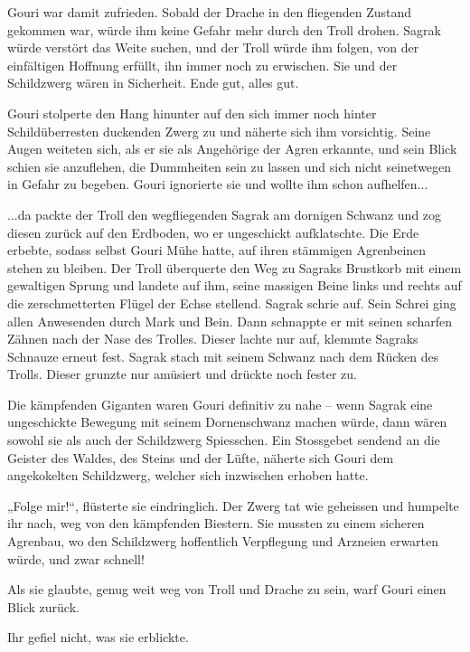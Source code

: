Gouri war damit zufrieden. Sobald der Drache in den fliegenden Zustand gekommen war, würde ihm keine Gefahr mehr durch den Troll drohen. Sagrak würde verstört das Weite suchen, und der Troll würde ihm folgen, von der einfältigen Hoffnung erfüllt, ihn immer noch zu erwischen. Sie und der Schildzwerg wären in Sicherheit. Ende gut, alles gut.

Gouri stolperte den Hang hinunter auf den sich immer noch hinter Schildüberresten duckenden Zwerg zu und näherte sich ihm vorsichtig. Seine Augen weiteten sich, als er sie als Angehörige der Agren erkannte, und sein Blick schien sie anzuflehen, die Dummheiten sein zu lassen und sich nicht seinetwegen in Gefahr zu begeben. Gouri ignorierte sie und wollte ihm schon aufhelfen...

...da packte der Troll den wegfliegenden Sagrak am dornigen Schwanz und zog diesen zurück auf den Erdboden, wo er ungeschickt aufklatschte. Die Erde erbebte, sodass selbst Gouri Mühe hatte, auf ihren stämmigen Agrenbeinen stehen zu bleiben. Der Troll überquerte den Weg zu Sagraks Brustkorb mit einem gewaltigen Sprung und landete auf ihm, seine massigen Beine links und rechts auf die zerschmetterten Flügel der Echse stellend. Sagrak schrie auf. Sein Schrei ging allen Anwesenden durch Mark und Bein. Dann schnappte er mit seinen scharfen Zähnen nach der Nase des Trolles. Dieser lachte nur auf, klemmte Sagraks Schnauze erneut fest. Sagrak stach mit seinem Schwanz nach dem Rücken des Trolls. Dieser grunzte nur amüsiert und drückte noch fester zu.

Die kämpfenden Giganten waren Gouri definitiv zu nahe – wenn Sagrak eine ungeschickte Bewegung mit seinem Dornenschwanz machen würde, dann wären sowohl sie als auch der Schildzwerg Spiesschen. Ein Stossgebet sendend an die Geister des Waldes, des Steins und der Lüfte, näherte sich Gouri dem angekokelten Schildzwerg, welcher sich inzwischen erhoben hatte.

„Folge mir!“, flüsterte sie eindringlich. Der Zwerg tat wie geheissen und humpelte ihr nach, weg von den kämpfenden Biestern. Sie mussten zu einem sicheren Agrenbau, wo den Schildzwerg hoffentlich Verpflegung und Arzneien erwarten würde, und zwar schnell!

Als sie glaubte, genug weit weg von Troll und Drache zu sein, warf Gouri einen Blick zurück.

Ihr gefiel nicht, was sie erblickte.

